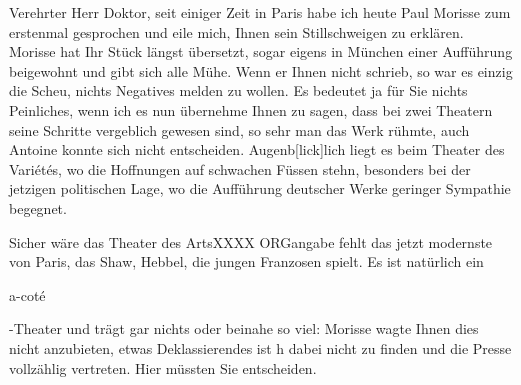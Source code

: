 \pstart{}Verehrter Herr Doktor,\pend\vspace{0.5em}
\pstart
           seit einiger Zeit in Paris habe ich heute Paul Morisse zum erstenmal gesprochen und eile
               mich, Ihnen sein Stillschweigen zu erklären. Morisse hat Ihr Stück längst übersetzt, sogar
               eigens in München einer Aufführung beigewohnt und gibt
               sich alle Mühe. Wenn er Ihnen nicht schrieb, so war es einzig die Scheu, nichts
               Negatives melden zu wollen. Es bedeutet ja für Sie nichts Peinliches, wenn ich es nun
               übernehme Ihnen zu sagen, dass bei zwei Theatern seine Schritte vergeblich gewesen
               sind, so sehr man das Werk rühmte, auch Antoine konnte sich nicht entscheiden. Augenb{[}lick{]}lich liegt es beim Theater des Variétés, wo die Hoffnungen auf schwachen Füssen
               stehn, besonders bei der jetzi{\pb}gen politischen Lage, wo die
               Aufführung deutscher Werke geringer Sympathie begegnet.\pend
           
\pstart
           Sicher wäre das Theater des ArtsXXXX ORGangabe fehlt das jetzt modernste von Paris, das Shaw, Hebbel, die jungen Franzosen spielt. Es ist natürlich
                  ein \begin{otherlanguage}{french}a-coté\end{otherlanguage}-Theater und trägt gar nichts oder beinahe so viel: Morisse wagte Ihnen dies nicht anzubieten, etwas
                  Deklassierendes ist h dabei nicht zu
                  finden und die Presse vollzählig vertreten. Hier müssten Sie entscheiden.\pend
           
